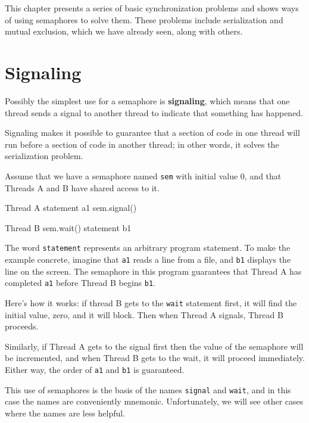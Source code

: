 
This chapter presents a series of basic synchronization problems and
shows ways of using semaphores to solve them.  These problems include
serialization and mutual exclusion, which we have already seen, along
with others.

\section{Signaling}

Possibly the simplest use for a semaphore is {\bf signaling},
which means that one thread sends a signal to another
thread to indicate that something has happened.

Signaling makes it possible to guarantee
that a section of code in one thread will run before a section of
code in another thread; in other words, it solves the serialization
problem.

Assume that we have a semaphore named {\tt sem} with initial value
0, and that Threads A and B have shared access to it.

\begin{lsthalfbox}[before skip=0.6em]{Thread A}
statement a1
sem.signal()
\end{lsthalfbox}
\begin{lsthalfbox}[after skip=0.6em]{Thread B}
sem.wait()
statement b1
\end{lsthalfbox}

The word {\tt statement} represents an arbitrary program statement.
To make the example concrete, imagine that {\tt a1} reads a line
from a file, and {\tt b1} displays the line on the screen.
The semaphore in this program guarantees that Thread A
has completed {\tt a1} before Thread B begins {\tt b1}.

Here's how it works: if thread B gets to the
{\tt wait} statement first, it will find the initial
value, zero, and it will block.  Then when Thread A signals,
Thread B proceeds.

Similarly, if Thread A gets to the signal first then the
value of the semaphore will be incremented, and when Thread
B gets to the wait, it will proceed immediately.
Either way, the order of {\tt a1} and {\tt b1} is guaranteed.

This use of semaphores is the basis of the names {\tt signal}
and {\tt wait}, and in this case the names are conveniently
mnemonic.  Unfortunately, we will see other cases where the
names are less helpful.

